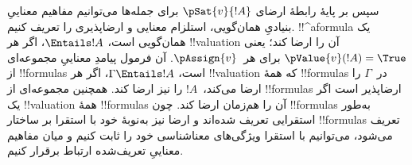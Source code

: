 \documentclass[../../../include/open-logic-section]{subfiles}
\begin{document}
سپس بر پایهٔ رابطهٔ ارضای $\pSat{v}{!A}$ برای جمله‌ها می‌توانیم مفاهیم
معناییِ بنیادیِ همان‌گویی، استلزام معنایی و ارضاپذیری را تعریف کنیم.
!!^a{formula} یک همان‌گویی است، $\Entails !A$، اگر هر !!{valuation} آن را
ارضا کند؛ یعنی $\pValue{v}(!A) = \True$ برای هر~$\pAssign{v}$.
آن فرمول پیامدِ معناییِ مجموعه‌ای از !!{formula}s است،
$\Gamma \Entails !A$، اگر هر !!{valuation} که همهٔ !!{formula}s در~$\Gamma$
را ارضا می‌کند،~$!A$ را نیز ارضا کند. همچنین مجموعه‌ای از !!{formula}s
ارضاپذیر است اگر یک !!{valuation} همهٔ !!{formula}s آن را هم‌زمان ارضا
کند. چون !!{formula}s به‌طور استقرایی تعریف شده‌اند و ارضا نیز به‌نوبهٔ
خود با استقرا بر ساختار !!{formula}s تعریف می‌شود، می‌توانیم با استقرا
ویژگی‌های معناشناسی خود را ثابت کنیم و میان مفاهیم معناییِ تعریف‌شده
ارتباط برقرار کنیم.
\end{document}
